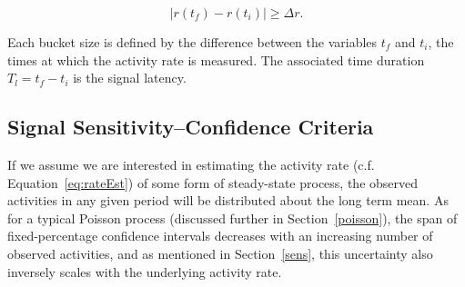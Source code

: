 \documentclass{article}
\begin{document}


\begin{equation}
    \label{eq:signal}
    | r(t_f) - r(t_i) | \geq \Delta r.
\end{equation}

Each bucket size is defined by the difference between the variables $t_f$ and $t_i$, the times at which 
the activity rate is measured. The associated time duration $T_l = t_f - t_i$ is the signal latency.  


\subsection{Signal Sensitivity--Confidence Criteria} 
\label{conf1}


If  
\reversemarginpar\marginpar{\raggedleft
%
    \begin{tikzpicture}[scale=0.26]]
\draw [red, very thick, rotate around={-60: (3.0, 0)}] (-0.7, -0.7) rectangle(3.7, 0.7);
%
\draw [very thick, <->] (0.25000000000000006, 0.4330127018922193) -- (1.25, 2.165063509461097) ;
\draw [very thick, <->] (1.75, 2.165063509461097) -- (2.75, 0.4330127018922193) ;
\draw [very thick, <->] (2.5, 0) -- (0.5, 0) ;
%
\draw [orange, ultra thick] (0,0) circle [radius= 0.5 ];
\draw [yellow, ultra thick] ( 1.5 , 2.59807621135 ) circle [radius= 0.5 ];
\draw [green,  ultra thick] ( 3.0 , 0 ) circle [radius= 0.5 ];
    \end{tikzpicture}
%
%
} 
we assume we are interested in estimating the activity rate (c.f. Equation~\ref{eq:rateEst}) of 
some form of steady-state process, the observed activities in any given period will be distributed 
about the long term mean. As for a typical Poisson process (discussed further in 
Section~\ref{poisson}), the span of fixed-percentage confidence intervals decreases with an 
increasing number of observed activities, and as mentioned in Section~\ref{sens}, this uncertainty 
also inversely scales with the underlying activity rate.
\end{document}
